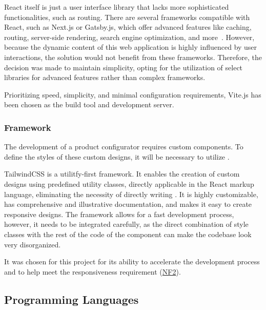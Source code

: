 React itself is just a user interface library that lacks more sophisticated functionalities, such as routing. There are several frameworks compatible with React, such as Next.js or Gatsby.js, which offer advanced features like caching, routing, server-side rendering, search engine optimization, and more~\cite{Eze2023}. However, because the dynamic content of this web application is highly influenced by user interactions, the solution would not benefit from these frameworks. Therefore, the decision was made to maintain simplicity, opting for the utilization of select libraries for advanced features rather than complex frameworks.

Prioritizing speed, simplicity, and minimal configuration requirements, Vite.js has been chosen as the build tool and development server.~\cite{Said2023}


\subsubsection{ Framework}

The development of a product configurator requires custom components. To define the styles of these custom designs, it will be necessary to utilize .

TailwindCSS is a utilitfy-first  framework. It enables the creation of custom designs using predefined  utility classes, directly applicable in the React markup language, eliminating the necessity of directly writing . It is highly customizable, has comprehensive and illustrative documentation, and makes it easy to create responsive designs. The framework allows for a fast development process, however, it needs to be integrated carefully, as the direct combination of style classes with the rest of the code of the component can make the codebase look very disorganized.~\cite{TailwindCSS}

It was chosen for this project for its ability to accelerate the development process and to help meet the responsiveness requirement (\hyperref[itm:NF2]{NF2}).


\subsection{Programming Languages}

